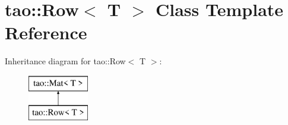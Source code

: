\hypertarget{classtao_1_1_row}{}\section{tao\+::Row$<$ T $>$ Class Template Reference}
\label{classtao_1_1_row}
Inheritance diagram for tao\+::Row$<$ T $>$\+:\begin{figure}[H]
\begin{center}
\leavevmode
\includegraphics[height=2.000000cm]{classtao_1_1_row}
\end{center}
\end{figure}
